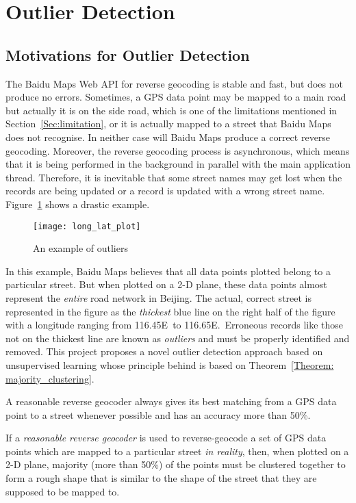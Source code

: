 \section{Outlier Detection}\label{outlier_detecting}
\subsection{Motivations for Outlier Detection}
The Baidu Maps Web API for reverse geocoding is stable and fast, but does not produce no errors. Sometimes, a GPS data point may be mapped to a main road but actually it is on the side road, which is one of the limitations mentioned in Section~\ref{Sec:limitation}, or it is actually mapped to a street that Baidu Maps does not recognise. In neither case will Baidu Maps produce a correct reverse geocoding. Moreover, the reverse geocoding process is asynchronous, which means that it is being performed in the background in parallel with the main application thread. Therefore, it is inevitable that some street names may get lost when the records are being updated or a record is updated with a wrong street name. Figure~\ref{Fig:exmp_outlier} shows a drastic example.

\begin{figure}[h!]
\texttt{[image: long\_lat\_plot]}
\centering
\caption{An example of outliers}\label{Fig:exmp_outlier}
\end{figure}

In this example, Baidu Maps believes that all data points plotted belong to a particular street. But when plotted on a 2-D plane, these data points almost represent the \emph{entire} road network in Beijing. The actual, correct street is represented in the figure as the \emph{thickest} blue line on the right half of the figure with a longitude ranging from 116.45\textdegree E~to 116.65\textdegree E.~Erroneous records like those not on the thickest line are known as \emph{outliers} and must be properly identified and removed. This project proposes a novel outlier detection approach based on unsupervised learning whose principle behind is based on Theorem~\ref{Theorem: majority_clustering}.

\begin{defn}\label{Def:reasonable_geocoder}
A reasonable reverse geocoder always gives its best matching from a GPS data point to a street whenever possible and has an accuracy more than 50\%.
\end{defn}

\begin{theorem}\label{Theorem: majority_clustering}
If a \emph{reasonable reverse geocoder} is used to reverse-geocode a set of GPS data points which are mapped to a particular street \emph{in reality}, then, when plotted on a 2-D plane, majority (more than 50\%) of the points must be clustered together to form a rough shape that is similar to the shape of the street that they are supposed to be mapped to. 
\end{theorem}

